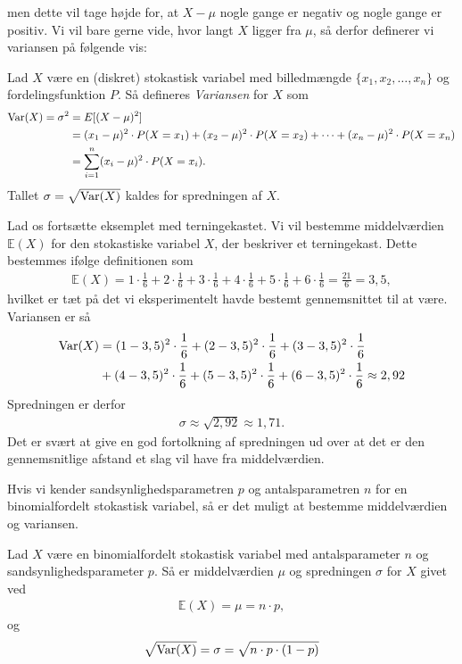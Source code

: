 men dette vil tage højde for, at $X-\mu$ nogle gange er negativ og nogle gange er positiv. Vi vil bare gerne vide, hvor langt $X$ ligger fra $\mu$, så derfor definerer vi variansen på følgende vis:
\begin{defn}[Varians]
Lad $X$ være en (diskret) stokastisk variabel med billedmængde $\{x_1,x_2,\hdots,x_n\}$ og fordelingsfunktion $P$. Så defineres \textit{Variansen} for $X$ som
\begin{align*}
\textnormal{Var}(X) = \sigma^2 &= E[(X-\mu)^2]\\
&= (x_1-\mu)^2\cdot P(X=x_1) + (x_2-\mu)^2\cdot P(X=x_2)+\cdots + (x_n-\mu)^2 \cdot P(X=x_n)\\
&= \sum_{i=1}^n (x_i-\mu)^2\cdot P(X=x_i).
\end{align*}
Tallet $\sigma = \sqrt{\textnormal{Var}(X)}$ kaldes for spredningen af $X$. 
\end{defn}

\begin{exa}
Lad os fortsætte eksemplet med terningekastet. Vi vil bestemme middelværdien $\mathbb{E}(X)$ for den stokastiske variabel $X$, der beskriver et terningekast. Dette bestemmes ifølge definitionen som
\begin{align*}
\mathbb{E}(X) = 1\cdot \frac{1}{6} + 2\cdot \frac{1}{6}+3\cdot \frac{1}{6}+4\cdot \frac{1}{6}+5\cdot \frac{1}{6}+6\cdot \frac{1}{6} = \frac{21}{6} = 3,5,
\end{align*}
hvilket er tæt på det vi eksperimentelt havde bestemt gennemsnittet til at være. 
Variansen er så
\begin{align*}
\textnormal{Var}(X) &= (1-3,5)^2 \cdot \frac{1}{6} + (2-3,5)^2 \cdot \frac{1}{6} + (3-3,5)^2 \cdot \frac{1}{6}\\
 &+ (4-3,5)^2 \cdot \frac{1}{6} + (5-3,5)^2 \cdot \frac{1}{6} +(6-3,5)^2 \cdot \frac{1}{6} \approx 2,92
\end{align*}
Spredningen er derfor 
\begin{align*}
\sigma \approx \sqrt{2,92} \approx 1,71.
\end{align*}
Det er svært at give en god fortolkning af spredningen ud over at det er den gennemsnitlige afstand et slag vil have fra middelværdien. 
\end{exa}

Hvis vi kender sandsynlighedsparametren $p$ og antalsparametren $n$ for en binomialfordelt stokastisk variabel, så er det muligt at bestemme middelværdien og variansen.
\begin{setn}
Lad $X$ være en binomialfordelt stokastisk variabel med antalsparameter $n$ og sandsynlighedsparameter $p$. Så er middelværdien $\mu$ og spredningen $\sigma$ for $X$ givet ved
\begin{align*}
\mathbb{E}(X) = \mu = n\cdot p,
\end{align*} 
og 
\[
\sqrt{\textnormal{Var}(X)} = \sigma = \sqrt{n\cdot p\cdot (1-p)}
\]
\end{setn}

